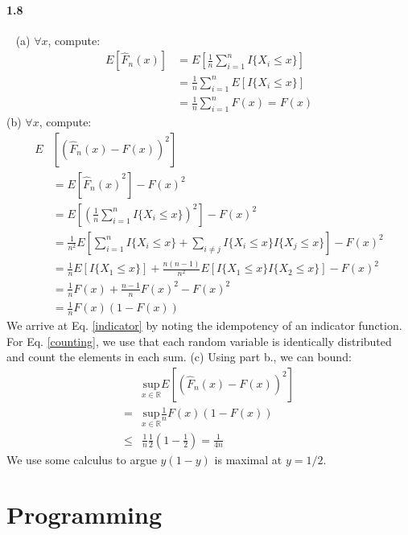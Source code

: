 \documentclass{article}
\begin{document}
\paragraph{1.8}\ \newline
(a) $\forall x$, compute:
\begin{align}
    E[\hat{F}_n(x)]
    &=E[\frac{1}{n}\sum_{i=1}^{n}I\{X_i \le x\}]\\
    &=\frac{1}{n}\sum_{i=1}^{n}E[I\{X_i \le x\}]\\
    &=\frac{1}{n}\sum_{i=1}^{n}F(x)=F(x)
\end{align}
\newline
\newline
(b) $\forall x$, compute:
\begin{align}
    E&[(\hat{F}_n(x)-F(x))^2] \\
    &=E[{\hat{F}_n(x)}^2]-F(x)^2 \\
    &=E[(\frac{1}{n}\sum_{i=1}^{n}I\{X_i \le x\})^2]-F(x)^2 \\
    &=\frac{1}{n^2} E[\sum_{i=1}^{n}I\{X_i \le x\} + \sum_{i\ne j}I\{X_i \le x\}I\{X_j \le x\}]-F(x)^2 \label{indicator} \\
    &=\frac{1}{n} E[I\{X_1 \le x\}] + \frac{n(n-1)}{n^2} E[I\{X_1 \le x\}I\{X_2 \le x\}]-F(x)^2 \label{counting} \\
    &=\frac{1}{n} F(x) + \frac{n-1}{n} F(x)^2 - F(x)^2 \\
    &=\frac{1}{n} F(x)(1-F(x))
\end{align}
We arrive at Eq. \ref{indicator} by noting the idempotency of an indicator function. For Eq. \ref{counting}, we use that each random variable is identically distributed and count the elements in each sum.
\newline
\newline
(c) Using part b., we can bound:
\begin{align}
    &\underset{x \in \mathds{R}}{\text{sup}} E[(\hat{F}_n(x)-F(x))^2] \\
    =&\underset{x \in \mathds{R}}{\text{sup}} \frac{1}{n} F(x)(1-F(x)) \\
    \le& \frac{1}{n}\frac{1}{2}(1-\frac{1}{2}) = \frac{1}{4n} \label{inequality}
\end{align}
We use some calculus to argue $y(1-y)$ is maximal at $y=1/2$.

\section{Programming}
\end{document}
